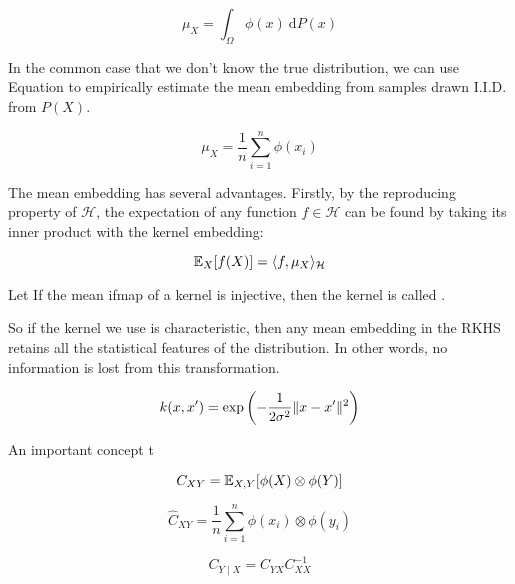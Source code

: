 \begin{equation}
\mu_{X} = \int_\Omega \phi(x) \ \mathrm{d}P(x)
\end{equation}

In the common case that we don't know the true distribution, we can use Equation to empirically estimate the mean embedding from samples drawn I.I.D. from $P(X)$.

\begin{equation}
\mu_{X} = \frac{1}{n} \sum_{i=1}^n \phi(x_i)
\end{equation}

The mean embedding has several advantages. Firstly, by the reproducing property of $\mathcal{H}$, the expectation of any function $f \in \mathcal{H}$ can be found by taking its inner product with the kernel embedding:

\begin{equation}
\mathbb{E}_X[f(X)] = \langle f, \mu_X\rangle_\mathcal{H}
\end{equation}

\begin{definition}
  Let If the mean ifmap of a kernel is injective, then the kernel is called .
\end{definition}

So if the kernel we use is characteristic, then any mean embedding in the RKHS retains all the statistical features of the distribution. In other words, no information is lost from this transformation.

\begin{equation}
  k(x,x') = \exp\left(-\frac{1}{2\sigma^2} \lVert x-x'\rVert^2 \right)
\end{equation}

An important concept t

\begin{equation}
  C_{XY} = \mathbb{E}_{X, Y}[\phi(X) \otimes \phi(Y)]
\end{equation}

\begin{equation}
	\widehat{C}_{XY} = \frac{1}{n} \sum_{i=1}^n \phi(x_i) \otimes \phi(y_i)
\end{equation}

\begin{equation}
	C_{Y \mid X} = C_{YX} C_{XX}^{-1}
\end{equation}
